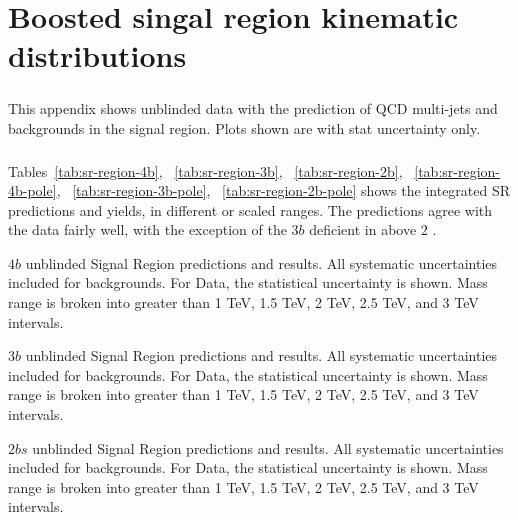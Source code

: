 \chapter{Boosted singal region kinematic distributions}
\label{AppendixSR}

\paragraph{}
This appendix shows unblinded data with the prediction of QCD multi-jets and \ttbar~ backgrounds in the signal region. Plots shown are with stat uncertainty only.

\paragraph{}
Tables~\ref{tab:sr-region-4b}, ~\ref{tab:sr-region-3b}, ~\ref{tab:sr-region-2b}, ~\ref{tab:sr-region-4b-pole}, ~\ref{tab:sr-region-3b-pole}, ~\ref{tab:sr-region-2b-pole} shows the integrated SR predictions and yields, in different \mtwoJ or scaled \mtwoJ ranges. The predictions agree with the data fairly well, with the exception of the $3b$ deficient in \mtwoJ above $2$ \TeV.

\begin{table}[htbp!]
\scriptsize
\begin{center}

\caption{$4b$ unblinded Signal Region predictions and results. All systematic uncertainties included for backgrounds. For Data, the statistical uncertainty is shown. Mass range is broken into greater than 1 TeV, 1.5 TeV, 2 TeV, 2.5 TeV, and 3 TeV intervals.}
\label{tab:sr-region-4b}
\end{center}
\end{table}

\begin{table}[htbp!]
\scriptsize
\begin{center}

\caption{$3b$ unblinded Signal Region predictions and results. All systematic uncertainties included for backgrounds. For Data, the statistical uncertainty is shown. Mass range is broken into greater than 1 TeV, 1.5 TeV, 2 TeV, 2.5 TeV, and 3 TeV intervals.}
\label{tab:sr-region-3b}
\end{center}
\end{table}

\begin{table}[htbp!]
\scriptsize
\begin{center}

\caption{$2bs$ unblinded Signal Region predictions and results. All systematic uncertainties included for backgrounds. For Data, the statistical uncertainty is shown. Mass range is broken into greater than 1 TeV, 1.5 TeV, 2 TeV, 2.5 TeV, and 3 TeV intervals.}
\label{tab:sr-region-2b}
\end{center}
\end{table}


